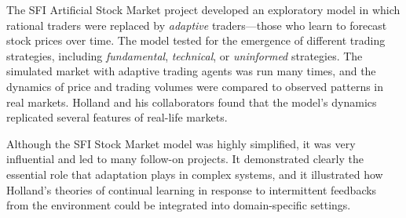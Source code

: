 \documentclass{sig-alternate}
\begin{document}
The SFI Artificial Stock Market project \cite{Arthur1997,Palmer1994}
developed an exploratory model in which rational
traders were replaced by \emph{adaptive} traders---those who learn to
forecast stock prices over time.  The model tested for the
emergence of different trading strategies, including
\emph{fundamental}, \emph{technical}, or \emph{uninformed}
strategies. The simulated market with adaptive trading agents was run
many times, and the dynamics of price and trading volumes were
compared to observed patterns in real markets.  Holland and his
collaborators found that the model's dynamics replicated several
features of real-life markets.

Although the SFI Stock Market model was highly simplified, it was very
influential and led to many follow-on projects.  It 
demonstrated clearly the essential role that adaptation plays in complex
systems, and it illustrated how Holland's theories of continual learning
in response to intermittent feedbacks from the environment could be
integrated into domain-specific settings.
\end{document}

